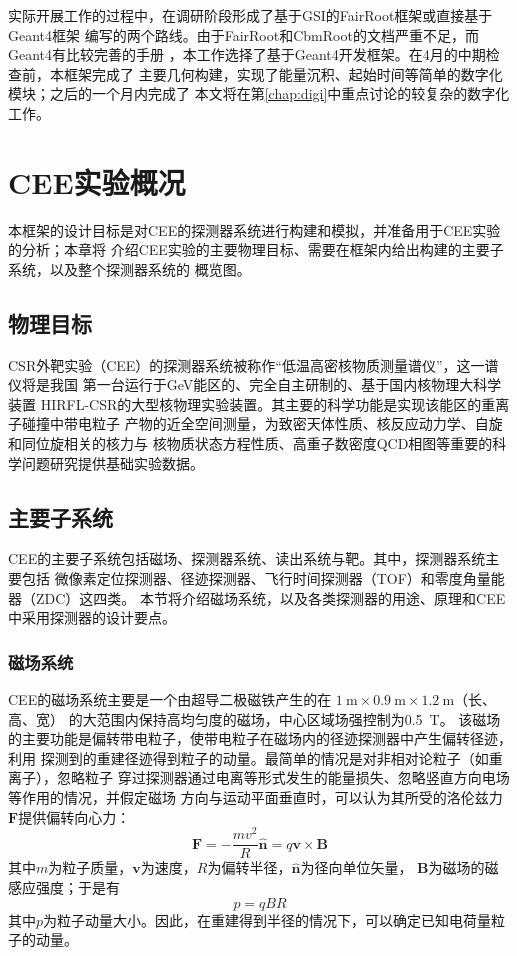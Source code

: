 \documentclass[bachelor,openany,oneside,color]{buaathesis}
\begin{document}
实际开展工作的过程中，在调研阶段形成了基于GSI的FairRoot框架或直接基于Geant4框架
编写的两个路线。由于FairRoot和CbmRoot的文档严重不足，而Geant4有比较完善的手册
\cite{Geant4}，本工作选择了基于Geant4开发框架。在4月的中期检查前，本框架完成了
主要几何构建，实现了能量沉积、起始时间等简单的数字化模块；之后的一个月内完成了
本文将在第\ref{chap:digi}中重点讨论的较复杂的数字化工作。

\chapter{CEE实验概况}

本框架的设计目标是对CEE的探测器系统进行构建和模拟，并准备用于CEE实验的分析；本章将
介绍CEE实验的主要物理目标、需要在框架内给出构建的主要子系统，以及整个探测器系统的
概览图。

\section{物理目标}

CSR外靶实验（CEE）的探测器系统被称作“低温高密核物质测量谱仪”，这一谱仪将是我国
第一台运行于\si{\giga\eV}能区的、完全自主研制的、基于国内核物理大科学装置
HIRFL-CSR的大型核物理实验装置。其主要的科学功能是实现该能区的重离子碰撞中带电粒子
产物的近全空间测量，为致密天体性质、核反应动力学、自旋和同位旋相关的核力与
核物质状态方程性质、高重子数密度QCD相图等重要的科学问题研究提供基础实验数据。
\cite{技术文档,Lyu:ConceptDesign}

\section{主要子系统}

CEE的主要子系统包括磁场、探测器系统、读出系统与靶。其中，探测器系统主要包括
微像素定位探测器、径迹探测器、飞行时间探测器（TOF）和零度角量能器（ZDC）这四类。
本节将介绍磁场系统，以及各类探测器的用途、原理和CEE中采用探测器的设计要点。

\subsection{磁场系统}

CEE的磁场系统主要是一个由超导二极磁铁产生的在
$\SI{1}{\meter}\times\SI{0.9}{\meter}\times\SI{1.2}{\meter}$（长、高、宽）
的大范围内保持高均匀度的磁场，中心区域场强控制为\SI{0.5}{\tesla}。
该磁场的主要功能是偏转带电粒子，使带电粒子在磁场内的径迹探测器中产生偏转径迹，利用
探测到的重建径迹得到粒子的动量。最简单的情况是对非相对论粒子（如重离子），忽略粒子
穿过探测器通过电离等形式发生的能量损失、忽略竖直方向电场等作用的情况，并假定磁场
方向与运动平面垂直时，可以认为其所受的洛伦兹力$\bm{F}$提供偏转向心力：
\begin{equation}\label{eq:B}
\bm{F} = -\frac{mv^2}{R}\hat{\bm{n}} = q\bm{v}\times\bm{B}
\end{equation}
其中$m$为粒子质量，$\bm{v}$为速度，$R$为偏转半径，$\hat{\bm{n}}$为径向单位矢量，
$\bm{B}$为磁场的磁感应强度；于是有
\begin{equation}
p = q B R
\end{equation}
其中$p$为粒子动量大小。因此，在重建得到半径的情况下，可以确定已知电荷量粒子的动量。
\end{document}

